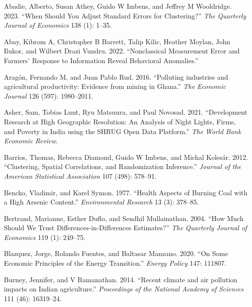 \documentclass[
]{article}
\newlength{\cslhangindent}
\newlength{\cslentryspacingunit} %
\newenvironment{CSLReferences}[2] %
 {%
  \setlength{\parindent}{0pt}
  \ifodd #1
  \let\oldpar\par
  \def\par{\hangindent=\cslhangindent\oldpar}
  \fi
  \setlength{\parskip}{#2\cslentryspacingunit}
 }%
 {}
\begin{document}
\hypertarget{refs}{}
\begin{CSLReferences}{1}{0}
\leavevmode{}%
Abadie, Alberto, Susan Athey, Guido W Imbens, and Jeffrey M Wooldridge. 2023. {``When Should You Adjust Standard Errors for Clustering?''} \emph{{The Quarterly Journal of Economics}} 138 (1): 1--35.

\leavevmode{}%
Abay, Kibrom A, Christopher B Barrett, Talip Kilic, Heather Moylan, John Ilukor, and Wilbert Drazi Vundru. 2022. {``{Nonclassical Measurement Error and Farmers' Response to Information Reveal Behavioral Anomalies}.''}

\leavevmode{}%
Aragón, Fernando M, and Juan Pablo Rud. 2016. {``{Polluting industries and agricultural productivity: Evidence from mining in Ghana}.''} \emph{{The Economic Journal}} 126 (597): 1980--2011.

\leavevmode{}%
Asher, Sam, Tobias Lunt, Ryu Matsuura, and Paul Novosad. 2021. {``{Development Research at High Geographic Resolution: An Analysis of Night Lights, Firms, and Poverty in India using the SHRUG Open Data Platform}.''} \emph{{The World Bank Economic Review}}.

\leavevmode{}%
Barrios, Thomas, Rebecca Diamond, Guido W Imbens, and Michal Kolesár. 2012. {``Clustering, Spatial Correlations, and Randomization Inference.''} \emph{{Journal of the American Statistical Association}} 107 (498): 578--91.

\leavevmode{}%
Bencko, Vladimir, and Karel Symon. 1977. {``Health Aspects of Burning Coal with a High Arsenic Content.''} \emph{{Environmental Research}} 13 (3): 378--85.

\leavevmode{}%
Bertrand, Marianne, Esther Duflo, and Sendhil Mullainathan. 2004. {``How Much Should We Trust Differences-in-Differences Estimates?''} \emph{{The Quarterly Journal of Economics}} 119 (1): 249--75.

\leavevmode{}%
Blazquez, Jorge, Rolando Fuentes, and Baltasar Manzano. 2020. {``On Some Economic Principles of the Energy Transition.''} \emph{{Energy Policy}} 147: 111807.

\leavevmode{}%
Burney, Jennifer, and V Ramanathan. 2014. {``{Recent climate and air pollution impacts on Indian agriculture}.''} \emph{{Proceedings of the National Academy of Sciences}} 111 (46): 16319--24.


\end{CSLReferences}
\end{document}
